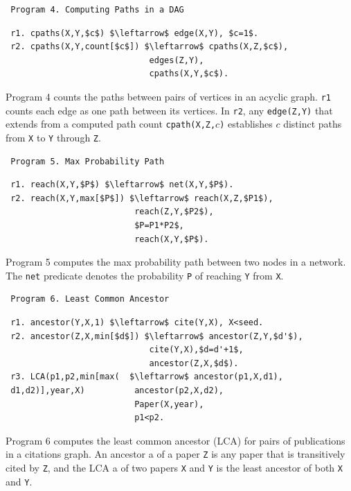 \begin{appendix}
 \begin{verbatim}
 Program 4. Computing Paths in a DAG
 \end{verbatim}\vspace{-0.1in}\small
 \begin{lstlisting}
 r1. cpaths(X,Y,$c$) $\leftarrow$ edge(X,Y), $c=1$.
 r2. cpaths(X,Y,count[$c$]) $\leftarrow$ cpaths(X,Z,$c$),
                             edges(Z,Y),
                             cpaths(X,Y,$c$).
 \end{lstlisting}
 \normalsize
 
 Program 4 counts the paths between pairs of vertices in an acyclic graph. \texttt{r1} counts each edge as one path between its vertices. In \texttt{r2}, any \texttt{edge(Z,Y)} that extends from a computed path count \texttt{cpath(X,Z,$c$)} establishes $c$ distinct paths from \texttt{X} to \texttt{Y} through \texttt{Z}.
 
 
 \begin{verbatim}
 Program 5. Max Probability Path
 \end{verbatim}\vspace{-0.1in}\small
 \begin{lstlisting}
 r1. reach(X,Y,$P$) $\leftarrow$ net(X,Y,$P$).
 r2. reach(X,Y,max[$P$]) $\leftarrow$ reach(X,Z,$P1$),
                          reach(Z,Y,$P2$),
                          $P=P1*P2$,
                          reach(X,Y,$P$).
 \end{lstlisting}
 \normalsize
 
 Program 5 \cite{7113340} computes the max probability path between two nodes in a network. The \texttt{net} predicate denotes the probability \texttt{P} of reaching \texttt{Y} from \texttt{X}.
 
 \begin{verbatim}
 Program 6. Least Common Ancestor
 \end{verbatim}\small
 \begin{lstlisting}
 r1. ancestor(Y,X,1) $\leftarrow$ cite(Y,X), X<seed.
 r2. ancestor(Z,X,min[$d$]) $\leftarrow$ ancestor(Z,Y,$d'$),
                             cite(Y,X),$d=d'+1$,
                             ancestor(Z,X,$d$).
 r3. LCA(p1,p2,min[max(  $\leftarrow$ ancestor(p1,X,d1),
 d1,d2)],year,X)          ancestor(p2,X,d2),
                          Paper(X,year),
                          p1<p2.
 \end{lstlisting}
 \normalsize
 
 Program 6 \cite{Wang:2015:AFR:2824032.2824052} computes the least common ancestor (LCA) for pairs of publications in a citations graph. An ancestor a of a paper \texttt{Z} is any paper that is transitively cited by \texttt{Z}, and the LCA a of two papers \texttt{X} and \texttt{Y} is the least ancestor of both \texttt{X} and \texttt{Y}.
 

\end{appendix}
